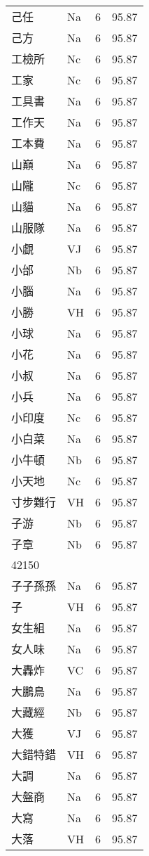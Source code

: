 \documentclass[twocolumn]{book}
\begin{document}
\begin{supertabular}{llrr}
己任 & Na & 6 &  95.87\\
己方 & Na & 6 &  95.87\\
工檢所 & Nc & 6 &  95.87\\
工家 & Nc & 6 &  95.87\\
工具書 & Na & 6 &  95.87\\
工作天 & Na & 6 &  95.87\\
工本費 & Na & 6 &  95.87\\
山巔 & Na & 6 &  95.87\\
山隴 & Nc & 6 &  95.87\\
山貓 & Na & 6 &  95.87\\
山服隊 & Na & 6 &  95.87\\
小覷 & VJ & 6 &  95.87\\
小邰 & Nb & 6 &  95.87\\
小腦 & Na & 6 &  95.87\\
小勝 & VH & 6 &  95.87\\
小球 & Na & 6 &  95.87\\
小花 & Na & 6 &  95.87\\
小叔 & Na & 6 &  95.87\\
小兵 & Na & 6 &  95.87\\
小印度 & Nc & 6 &  95.87\\
小白菜 & Na & 6 &  95.87\\
小牛頓 & Nb & 6 &  95.87\\
小天地 & Nc & 6 &  95.87\\
寸步難行 & VH & 6 &  95.87\\
子游 & Nb & 6 &  95.87\\
子章 & Nb & 6 &  95.87\\
42150\\
子子孫孫 & Na & 6 &  95.87\\
子 & VH & 6 &  95.87\\
女生組 & Na & 6 &  95.87\\
女人味 & Na & 6 &  95.87\\
大轟炸 & VC & 6 &  95.87\\
大鵬鳥 & Na & 6 &  95.87\\
大藏經 & Nb & 6 &  95.87\\
大獲 & VJ & 6 &  95.87\\
大錯特錯 & VH & 6 &  95.87\\
大調 & Na & 6 &  95.87\\
大盤商 & Na & 6 &  95.87\\
大寫 & Na & 6 &  95.87\\
大落 & VH & 6 &  95.87\\

\end{supertabular}
\end{document}
